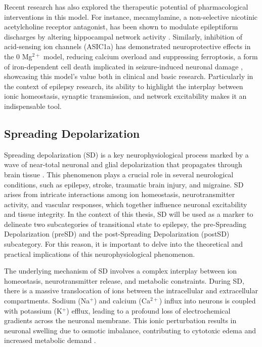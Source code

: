 \documentclass{article}
\begin{document}
Recent research has also explored the therapeutic potential of pharmacological interventions in this model. For instance, mecamylamine, a non-selective nicotinic acetylcholine receptor antagonist, has been shown to modulate epileptiform discharges by altering hippocampal network activity \cite{zapukhliak2021}. Similarly, inhibition of acid-sensing ion channels (ASIC1a) has demonstrated neuroprotective effects in the 0 Mg$^{2+}$ model, reducing calcium overload and suppressing ferroptosis, a form of iron-dependent cell death implicated in seizure-induced neuronal damage \cite{xiaorui2023}, showcasing this model's value both in clinical and basic research. Particularly in the context of epilepsy research, its ability to highlight the interplay between ionic homeostasis, synaptic transmission, and network excitability makes it an indispensable tool.

\subsection{Spreading Depolarization} \label{sec:spreading_depolarization}

Spreading depolarization (SD) is a key neurophysiological process marked by a wave of near-total neuronal and glial depolarization that propagates through brain tissue \cite{aiba2025}. This phenomenon plays a crucial role in several neurological conditions, such as epilepsy, stroke, traumatic brain injury, and migraine. SD arises from intricate interactions among ion homeostasis, neurotransmitter activity, and vascular responses, which together influence neuronal excitability and tissue integrity. In the context of this thesis, SD will be used as a marker to delineate two subcategories of transitional state to epilepsy, the pre-Spreading Depolarization (preSD) and the post-Spreading Depolarization (postSD) subcategory. For this reason, it is important to delve into the theoretical and practical implications of this neurophysiological phenomenon.

The underlying mechanism of SD involves a complex interplay between ion homeostasis, neurotransmitter release, and metabolic constraints. During SD, there is a massive translocation of ions between the intracellular and extracellular compartments. Sodium (Na$^+$) and calcium (Ca$^{2+}$) influx into neurons is coupled with potassium (K$^+$) efflux, leading to a profound loss of electrochemical gradients across the neuronal membrane. This ionic perturbation results in neuronal swelling due to osmotic imbalance, contributing to cytotoxic edema and increased metabolic demand \cite{drenckhahn2012}.
\end{document}

